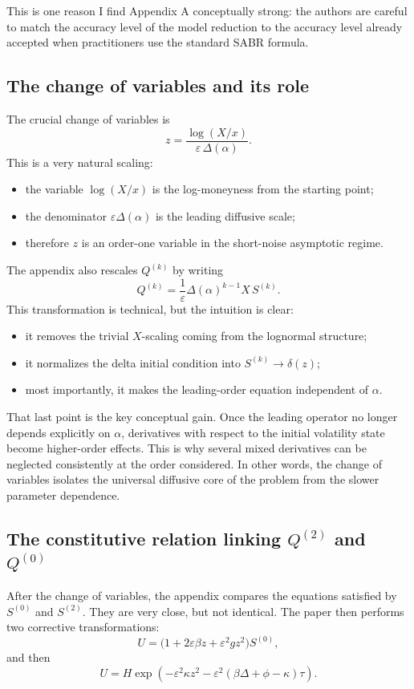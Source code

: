 \documentclass[11pt]{article}
\newcommand{\eps}{\varepsilon}
\begin{document}
This is one reason I find Appendix A conceptually strong: the authors are careful to match the accuracy level of the model reduction to the accuracy level already accepted when practitioners use the standard SABR formula.

\subsection{The change of variables and its role}

The crucial change of variables is
\[
z=\frac{\log(X/x)}{\eps\,\Delta(\alpha)}.
\]
This is a very natural scaling:
\begin{itemize}
    \item the variable \(\log(X/x)\) is the log-moneyness from the starting point;
    \item the denominator \(\eps \Delta(\alpha)\) is the leading diffusive scale;
    \item therefore \(z\) is an order-one variable in the short-noise asymptotic regime.
\end{itemize}

The appendix also rescales \(Q^{(k)}\) by writing
\[
Q^{(k)}=\frac{1}{\eps}\Delta(\alpha)^{k-1} X\, S^{(k)}.
\]
This transformation is technical, but the intuition is clear:
\begin{itemize}
    \item it removes the trivial \(X\)-scaling coming from the lognormal structure;
    \item it normalizes the delta initial condition into \(S^{(k)}\to \delta(z)\);
    \item most importantly, it makes the leading-order equation independent of \(\alpha\).
\end{itemize}

That last point is the key conceptual gain. Once the leading operator no longer depends explicitly on \(\alpha\), derivatives with respect to the initial volatility state become higher-order effects. This is why several mixed derivatives can be neglected consistently at the order considered. In other words, the change of variables isolates the universal diffusive core of the problem from the slower parameter dependence.

\subsection{The constitutive relation linking \(Q^{(2)}\) and \(Q^{(0)}\)}

After the change of variables, the appendix compares the equations satisfied by \(S^{(0)}\) and \(S^{(2)}\). They are very close, but not identical. The paper then performs two corrective transformations:
\[
U=\bigl(1+2\eps\beta z+\eps^2 g z^2\bigr)S^{(0)},
\]
and then
\[
U = H\exp\!\left(-\eps^2\kappa z^2-\eps^2(\beta\Delta+\phi-\kappa)\tau\right).
\]
\end{document}
